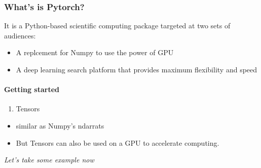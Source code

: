 \documentclass{ctexart}
\providecommand{\tightlist}{%
      \setlength{\itemsep}{0pt}\setlength{\parskip}{0pt}}
\begin{document}
    \subsubsection{What's is Pytorch?}\label{whats-is-pytorch}

It is a Python-based scientific computing package targeted at two sets
of audiences:

\begin{itemize}
\tightlist
\item
  A replcement for Numpy to use the power of GPU
\item
  A deep learning search platform that provides maximum flexibility and
  speed
\end{itemize}

    \paragraph{Getting started}\label{getting-started}

\begin{enumerate}
\def\labelenumi{\arabic{enumi}.}
\tightlist
\item
  Tensors
\end{enumerate}

\begin{itemize}
\tightlist
\item
  similar as Numpy's ndarrats
\item
  But Tensors can also be used on a GPU to accelerate computing.
\end{itemize}

\emph{Let's take some example now}
\end{document}
